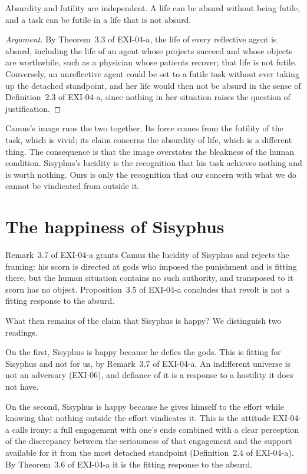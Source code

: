\documentclass{situationist-preprint}
\begin{document}
\begin{proposition}\label{p:distinct}
Absurdity and futility are independent. A life can be absurd without being futile, and a task can be futile in a life that is not absurd.
\end{proposition}

\begin{proof}[Argument]
By Theorem~3.3 of EXI-04-a, the life of every reflective agent is absurd, including the life of an agent whose projects succeed and whose objects are worthwhile, such as a physician whose patients recover; that life is not futile. Conversely, an unreflective agent could be set to a futile task without ever taking up the detached standpoint, and her life would then not be absurd in the sense of Definition~2.3 of EXI-04-a, since nothing in her situation raises the question of justification.
\end{proof}

Camus's image runs the two together. Its force comes from the futility of the task, which is vivid; its claim concerns the absurdity of life, which is a different thing. The consequence is that the image overstates the bleakness of the human condition. Sisyphus's lucidity is the recognition that his task achieves nothing and is worth nothing. Ours is only the recognition that our concern with what we do cannot be vindicated from outside it.

\section{The happiness of Sisyphus}

Remark~3.7 of EXI-04-a grants Camus the lucidity of Sisyphus and rejects the framing: his scorn is directed at gods who imposed the punishment and is fitting there, but the human situation contains no such authority, and transposed to it scorn has no object. Proposition~3.5 of EXI-04-a concludes that revolt is not a fitting response to the absurd.

What then remains of the claim that Sisyphus is happy? We distinguish two readings.

On the first, Sisyphus is happy because he defies the gods. This is fitting for Sisyphus and not for us, by Remark~3.7 of EXI-04-a. An indifferent universe is not an adversary (EXI-06), and defiance of it is a response to a hostility it does not have.

On the second, Sisyphus is happy because he gives himself to the effort while knowing that nothing outside the effort vindicates it. This is the attitude EXI-04-a calls irony: a full engagement with one's ends combined with a clear perception of the discrepancy between the seriousness of that engagement and the support available for it from the most detached standpoint (Definition~2.4 of EXI-04-a). By Theorem~3.6 of EXI-04-a it is the fitting response to the absurd.
\end{document}
